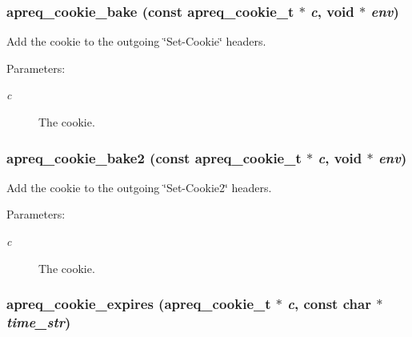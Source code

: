 \subsubsection{ apreq\_\-cookie\_\-bake (const {\bf apreq\_\-cookie\_\-t} $\ast$ {\em c}, {\bf void} $\ast$ {\em env})}\label{group__cookies_a10}


Add the cookie to the outgoing \char`\"{}Set-Cookie\char`\"{} headers.\begin{Desc}
\item[Parameters: ]\par
\begin{description}
\item[{\em 
c}]The cookie. \end{description}
\end{Desc}
\subsubsection{ apreq\_\-cookie\_\-bake2 (const {\bf apreq\_\-cookie\_\-t} $\ast$ {\em c}, {\bf void} $\ast$ {\em env})}\label{group__cookies_a11}


Add the cookie to the outgoing \char`\"{}Set-Cookie2\char`\"{} headers.\begin{Desc}
\item[Parameters: ]\par
\begin{description}
\item[{\em 
c}]The cookie. \end{description}
\end{Desc}
\subsubsection{ apreq\_\-cookie\_\-expires ({\bf apreq\_\-cookie\_\-t} $\ast$ {\em c}, const char $\ast$ {\em time\_\-str})}\label{group__cookies_a9}


